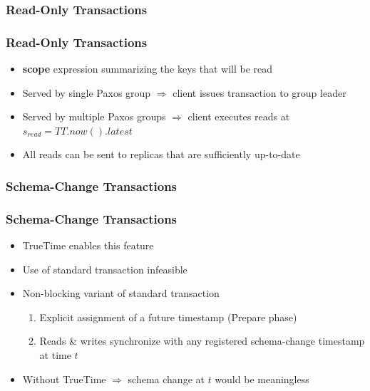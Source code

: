 \documentclass{beamer}
\begin{document}
\subsubsection{Read-Only Transactions}
\begin{frame}
  \frametitle{Read-Only Transactions}
  \begin{itemize}
    \item{\textbf{scope} expression summarizing the keys that will be read}
    \item{Served by single Paxos group \newline
      $\Rightarrow$ client issues transaction to group leader
    }
    \item{Served by multiple Paxos groups \newline
      $\Rightarrow$ client executes reads at $s_{read} = TT.now().latest$
    }
    \item{All reads can be sent to replicas that are sufficiently up-to-date}
  \end{itemize}
\end{frame}

\subsubsection{Schema-Change Transactions}
\begin{frame}
  \frametitle{Schema-Change Transactions}
  \begin{itemize}
    \item{TrueTime enables this feature}
    \item{Use of standard transaction infeasible}
    \item{Non-blocking variant of standard transaction}
    \begin{enumerate}
      \item{Explicit assignment of a future timestamp (Prepare phase)}
      \item{Reads \& writes synchronize with any registered schema-change
        timestamp at time $t$
      }
    \end{enumerate}
    \item{Without TrueTime $\Rightarrow$ schema change at $t$ would be meaningless
    }
  \end{itemize}
\end{frame}

\end{document}
